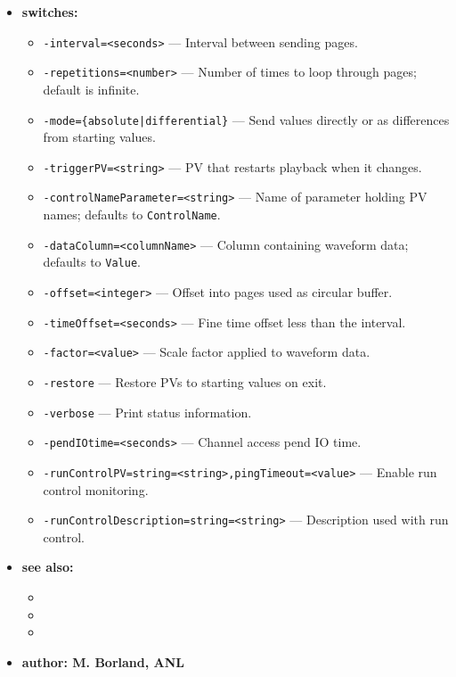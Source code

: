 \begin{itemize}
\item {\bf switches:}
  \begin{itemize}
  \item {\tt -interval=<seconds>} --- Interval between sending pages.
  \item {\tt -repetitions=<number>} --- Number of times to loop through pages; default is infinite.
  \item {\tt -mode=\{absolute|differential\}} --- Send values directly or as differences from starting values.
  \item {\tt -triggerPV=<string>} --- PV that restarts playback when it changes.
  \item {\tt -controlNameParameter=<string>} --- Name of parameter holding PV names; defaults to {\tt ControlName}.
  \item {\tt -dataColumn=<columnName>} --- Column containing waveform data; defaults to {\tt Value}.
  \item {\tt -offset=<integer>} --- Offset into pages used as circular buffer.
  \item {\tt -timeOffset=<seconds>} --- Fine time offset less than the interval.
  \item {\tt -factor=<value>} --- Scale factor applied to waveform data.
  \item {\tt -restore} --- Restore PVs to starting values on exit.
  \item {\tt -verbose} --- Print status information.
  \item {\tt -pendIOtime=<seconds>} --- Channel access pend IO time.
  \item {\tt -runControlPV=string=<string>,pingTimeout=<value>} --- Enable run control monitoring.
  \item {\tt -runControlDescription=string=<string>} --- Description used with run control.
  \end{itemize}

\item {\bf see also:}
  \begin{itemize}
  \item {}
  \item {}
  \item {}
  \end{itemize}

\item {\bf author: M. Borland, ANL}
\end{itemize}

